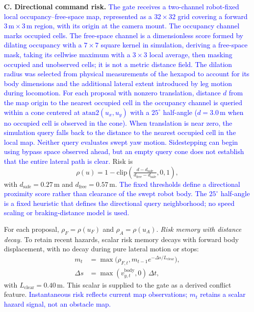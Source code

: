 \documentclass[letterpaper, 10 pt, conference]{ieeeconf}
\newcommand{\uF}{u_{F}}
\newcommand{\uA}{u_{A}}
\newcommand{\rev}[1]{\textcolor{blue}{#1}}
\begin{document}
\textbf{C. Directional command risk.}
\rev{The gate receives a two-channel robot-fixed local occupancy--free-space map, represented as a $32\times32$ grid covering a forward $3\,\mathrm{m}\times3\,\mathrm{m}$ region, with its origin at the camera mount. The occupancy channel marks occupied cells. The free-space channel is a dimensionless score formed by dilating occupancy with a $7\times7$ square kernel in simulation, deriving a free-space mask, taking its cellwise maximum with a $3\times3$ local average, then masking occupied and unobserved cells; it is not a metric distance field. The dilation radius was selected from physical measurements of the hexapod to account for its body dimensions and the additional lateral extent introduced by leg motion during locomotion. For each proposal with nonzero translation, distance $d$ from the map origin to the nearest occupied cell in the occupancy channel is queried within a cone centered at $\mathrm{atan2}(u_x,u_y)$ with a $25^\circ$ half-angle ($d=3.0\,\mathrm{m}$ when no occupied cell is observed in the cone). When translation is near zero, the simulation query falls back to the distance to the nearest occupied cell in the local map. Neither query evaluates swept yaw motion. Sidestepping can begin using bypass space observed ahead, but an empty query cone does not establish that the entire lateral path is clear.} Risk is
\begin{equation}
\rho(u)=1-\mathrm{clip}\!\left(\tfrac{d-d_{\mathrm{safe}}}
{d_{\mathrm{free}}-d_{\mathrm{safe}}},0,1\right),
\end{equation}
with $d_{\mathrm{safe}}=0.27\,\mathrm{m}$ and
$d_{\mathrm{free}}=0.57\,\mathrm{m}$. \rev{The fixed thresholds define a directional proximity score rather than clearance of the swept robot body. The $25^\circ$ half-angle is a fixed heuristic that defines the directional query neighborhood; no speed scaling or braking-distance model is used.}

For each proposal, $\rho_F=\rho(\uF)$ and $\rho_A=\rho(\uA)$. \emph{Risk memory with distance decay.} To retain recent hazards, scalar risk memory decays with forward body displacement, with no decay during pure lateral motion or stops:
\begin{equation}
\begin{aligned}
m_t &= \max\!\big(\rho_{F,t},m_{t-1}e^{-\Delta s/L_{\mathrm{clear}}}\big),\\
\Delta s &= \max(v_{y,t}^{\mathrm{body}},0)\,\Delta t,
\end{aligned}
\end{equation}
with $L_{\mathrm{clear}}=0.40\,\mathrm{m}$. This scalar is supplied to the
gate as a derived conflict feature. \rev{Instantaneous risk reflects current map observations; $m_t$ retains a scalar hazard signal, not an obstacle map.}
\end{document}
